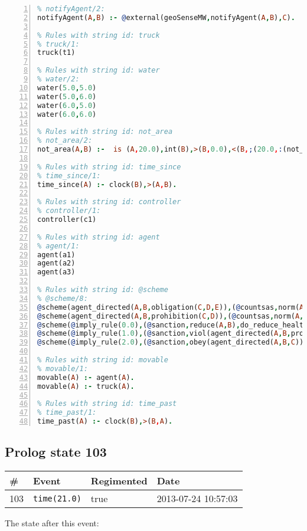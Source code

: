 \documentclass[11pt]{article}\usepackage[utf8]{inputenc}\usepackage{geometry}
\begin{document}
\begin{lstlisting}[language=Prolog, numbers=left]
% Rules with string id: notifyAgent
% notifyAgent/2:
notifyAgent(A,B) :- @external(geoSenseMW,notifyAgent(A,B),C).

% Rules with string id: truck
% truck/1:
truck(t1)

% Rules with string id: water
% water/2:
water(5.0,5.0)
water(5.0,6.0)
water(6.0,5.0)
water(6.0,6.0)

% Rules with string id: not_area
% not_area/2:
not_area(A,B) :-  is (A,20.0),int(B),>(B,0.0),<(B,;(20.0,:(not_area(A,B), is (-(B),20.0)))),int(A),>(A,0.0),<(A,;(20.0,:(area(A,B),-(int(A))))),int(B),>(A,0.0),>(B,0.0),<(A,21.0),<(B,21.0).

% Rules with string id: time_since
% time_since/1:
time_since(A) :- clock(B),>(A,B).

% Rules with string id: controller
% controller/1:
controller(c1)

% Rules with string id: agent
% agent/1:
agent(a1)
agent(a2)
agent(a3)

% Rules with string id: @scheme
% @scheme/8:
@scheme(agent_directed(A,B,obligation(C,D,E)),(@countsas,norm(A,B,F,obligation(C,D,E)),F),false,(listTrue(C)),(time_past(D)),false,[plus(viol(agent_directed(A,B,obligation(C,D,E))))|[]],[plus(obey(agent_directed(A,B,obligation(C,D,E))))|[]])
@scheme(agent_directed(A,B,prohibition(C,D)),(@countsas,norm(A,B,E,prohibition(C,D)),E),(listTrue(C)),false,(false),false,[plus(viol(agent_directed(A,B,prohibition(C,D))))|[]],[plus(obey(agent_directed(A,B,prohibition(C,D))))|[]])
@scheme(@imply_rule(0.0),(@sanction,reduce(A,B),do_reduce_health(A,B),notifyAgent(A,changed(status))),true,false,false,false,[min(reduce(A,B))|[]],[])
@scheme(@imply_rule(1.0),(@sanction,viol(agent_directed(A,B,prohibition(C,D))),do_sanction(D)),true,false,false,false,[min(viol(agent_directed(A,B,prohibition(C,D))))|[]],[])
@scheme(@imply_rule(2.0),(@sanction,obey(agent_directed(A,B,C))),true,false,false,false,[min(obey(agent_directed(A,B,C)))|[]],[])

% Rules with string id: movable
% movable/1:
movable(A) :- agent(A).
movable(A) :- truck(A).

% Rules with string id: time_past
% time_past/1:
time_past(A) :- clock(B),>(B,A).

\end{lstlisting}
\clearpage 
\subsection{Prolog state 103}
\begin{table}[ht]
\centering 
\begin{tabular}{l l l l} 
\textbf{\#} & \textbf{Event} & \textbf{Regimented} & \textbf{Date} \\ [0.5ex] 
\hline
103&\texttt{time(21.0)}&true&2013-07-24 10:57:03\\ [1ex] \hline\end{tabular}
\end{table}
The state after this event:
\end{document}
